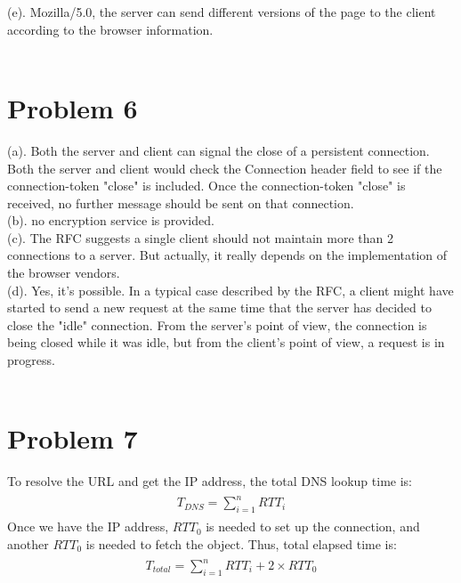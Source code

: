 \documentclass[titlepage, paper=a4, fontsize=11pt]{scrartcl} %
\numberwithin{equation}{section} %
\numberwithin{figure}{section} %
\numberwithin{table}{section} %
\begin{document}
(e). Mozilla/5.0, the server can send different versions of the page to the client according to the browser information. \\
\\



\section*{Problem 6}
(a). Both the server and client can signal the close of a persistent connection. Both the server and client
would check the Connection header field to see if the connection-token "close" is included. Once the
connection-token "close" is received, no further message should be sent on that connection. \\

(b). no encryption service is provided. \\

(c). The RFC suggests a single client should not maintain more than 2 connections to a server. But actually,
it really depends on the implementation of the browser vendors. \\

(d). Yes, it's possible. In a typical case described by the RFC, a client might have started to send a new request
at the same time that the server has decided to close the "idle" connection. From the server's point of view,
the connection is being closed while it was idle, but from the client's point of view, a request is in progress.\\
\\



\section*{Problem 7}
To resolve the URL and get the IP address, the total DNS lookup time is:
\begin{align*} 
\begin{split}
T_{DNS} = \sum\limits_{i=1}^n RTT_{i} 
\end{split}					
\end{align*}
Once we have the IP address, $RTT_{0}$ is needed to set up the connection,
and another $RTT_{0}$ is needed to fetch the object. Thus, total elapsed time is:
\begin{align*} 
\begin{split}
T_{total} = \sum\limits_{i=1}^n RTT_{i} + 2 \times RTT_{0}
\end{split}					
\end{align*}
\\
\end{document}
